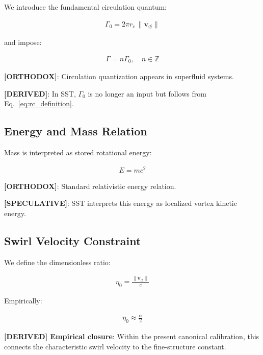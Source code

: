 \documentclass[11pt]{article}
\theoremstyle{definition}
\theoremstyle{plain}
\theoremstyle{remark}
\newcommand{\rc}{{r_c}}
\newcommand{\vnorm}{\lVert \mathbf{v}_{\!\boldsymbol{\circlearrowleft}} \rVert}
\begin{document}
        We introduce the fundamental circulation quantum:
        
        \begin{align}
            \Gamma_0 = 2\pi \rc \, \vnorm
            \label{eq:gamma0}
        \end{align}
        
        and impose:
        
        \begin{align}
            \Gamma = n \Gamma_0, \quad n \in \mathbb{Z}
        \end{align}
        
        \textbf{[ORTHODOX]}: Circulation quantization appears in superfluid systems.
        
        \textbf{[DERIVED]}: In SST, $\Gamma_0$ is no longer an input but follows from Eq.~\ref{eq:rc_definition}.
    
    \subsection{Energy and Mass Relation}
        
        Mass is interpreted as stored rotational energy:
        
        \begin{align}
            E = m c^2
        \end{align}
        
        \textbf{[ORTHODOX]}: Standard relativistic energy relation.
        
        \textbf{[SPECULATIVE]}: SST interprets this energy as localized vortex kinetic energy.
    
    \subsection{Swirl Velocity Constraint}
        
        We define the dimensionless ratio:
        
        \begin{align}
            \eta_0 = \frac{\vnorm}{c}
        \end{align}
        
        Empirically:
        
        \begin{align}
            \eta_0 \approx \frac{\alpha}{2}
        \end{align}
        
        \textbf{[DERIVED] Empirical closure}: Within the present canonical calibration, this connects the characteristic swirl velocity to the fine-structure constant.
\end{document}
